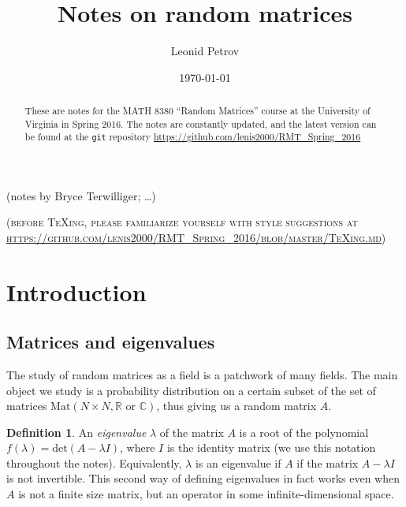 \documentclass[letterpaper,11pt,oneside,reqno]{amsart}
\numberwithin{equation}{section}
\newcommand{\note}[1]{\textsc{\color{blue}(#1)}}
\newcounter{lecture}
\newcommand{\lect}[1]{\medskip\addtocounter{lecture}{1}\noindent{\Large\textbf{\color{red}Lecture \#\arabic{lecture} on #1 \hrulefill}}\medskip}
\theoremstyle{definition}
\newtheorem{definition}[proposition]{Definition}
\begin{document}
\title[Notes on random matrices]{Notes on random matrices}

\author[L. Petrov]{Leonid Petrov}
\date{\today}
\maketitle

\begin{center}
	(notes by Bryce Terwilliger; \ldots)
\end{center}

\begin{abstract}
	These are notes for the MATH 8380 ``Random Matrices'' course at the
	University of Virginia in Spring 2016. The notes are constantly updated,
	and the latest version can be found at the \texttt{git} repository
	\url{https://github.com/lenis2000/RMT_Spring_2016}
\end{abstract}

\bigskip

\begin{center}
\noindent\note{before \TeX{}ing, please familiarize yourself with style suggestions at\\
\url{https://github.com/lenis2000/RMT_Spring_2016/blob/master/TeXing.md}}
\end{center}
\bigskip

\setcounter{tocdepth}{1}
\tableofcontents
\setcounter{tocdepth}{3}

\lect{1/20/2016}

\section{Introduction} %
\label{sec:introduction}

\subsection{Matrices and eigenvalues} %
\label{sub:object_of_study}

The study of random matrices as a field is a patchwork of many fields.  The
main object we study is a probability distribution on a certain subset of the
set of matrices $\mathrm{Mat}(N\times N,\mathbb R \text{ or } \mathbb C)$,
thus giving us a random matrix $A$.

\begin{definition}
An {\it eigenvalue} $\lambda$ of the matrix $A$ is a root of the polynomial
$f(\lambda)=\text{det}(A-\lambda I)$, where $I$ is the identity matrix 
(we use this notation throughout the notes).  
Equivalently, $\lambda$ is an
eigenvalue if $A$ if the matrix $A-\lambda I$ is not invertible. This second
way of defining eigenvalues in fact works even when $A$ is not a finite
size matrix, but an operator in some infinite-dimensional space.
\end{definition}
\end{document}

